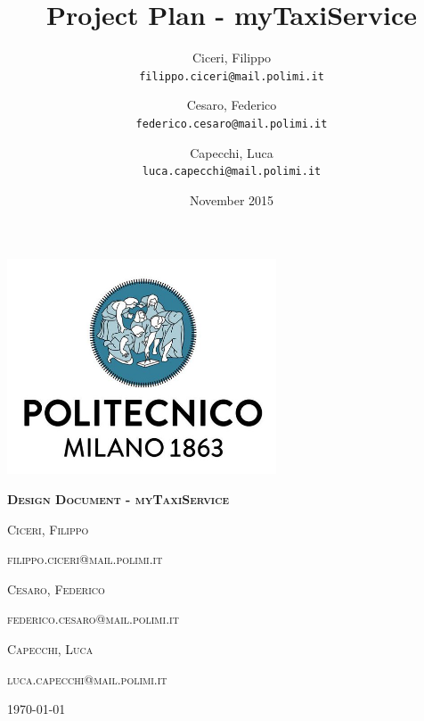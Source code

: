 \documentclass[12pt,a4paper,titlepage]{article}
\title{Project Plan - myTaxiService}
\author{
	Ciceri, Filippo \\
	\texttt{filippo.ciceri@mail.polimi.it}
	\and
	Cesaro, Federico \\
	\texttt{federico.cesaro@mail.polimi.it}
	\and
	Capecchi, Luca \\
	\texttt{luca.capecchi@mail.polimi.it}
}
\date{November 2015}
\begin{document}
\begin{titlepage}
	\centering
	\includegraphics[width=8cm]{polimiLogo}\par\vspace{2cm}
	{\scshape\huge\bfseries Design Document - myTaxiService \par}
	\vspace{1.5cm}
	{\scshape\large Ciceri, Filippo \par}
	{\scshape\normalsize filippo.ciceri@mail.polimi.it \par}
	\vspace{0.5cm}
	{\scshape\large Cesaro, Federico \par}
	{\scshape\normalsize federico.cesaro@mail.polimi.it \par}
	\vspace{0.5cm}
	{\scshape\large Capecchi, Luca \par}
	{\scshape\normalsize luca.capecchi@mail.polimi.it \par}
	\vspace{0.5cm}

	\vfill

	{\large \today\par}
\end{titlepage}
\tableofcontents
\newpage

%

\newpage


\newpage


\newpage


\newpage


\newpage

\end{document}
